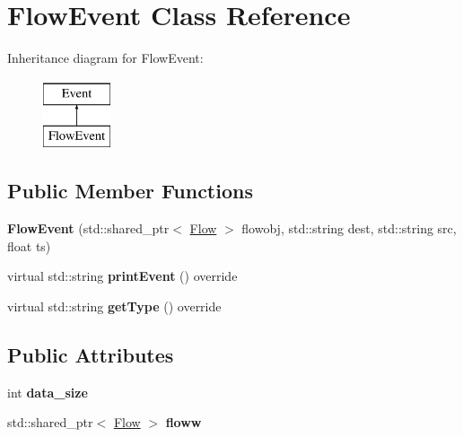 \hypertarget{classFlowEvent}{\section{\-Flow\-Event \-Class \-Reference}
\label{classFlowEvent}
}
\-Inheritance diagram for \-Flow\-Event\-:\begin{figure}[H]
\begin{center}
\leavevmode
\includegraphics[height=2.000000cm]{classFlowEvent}
\end{center}
\end{figure}
\subsection*{\-Public \-Member \-Functions}
\begin{DoxyCompactItemize}
\item 
\hypertarget{classFlowEvent_a847531a58e1e8ff6adf4a51fad9cc2c0}{{\bfseries \-Flow\-Event} (std\-::shared\-\_\-ptr$<$ \hyperlink{classFlow}{\-Flow} $>$ flowobj, std\-::string dest, std\-::string src, float ts)}\label{classFlowEvent_a847531a58e1e8ff6adf4a51fad9cc2c0}

\item 
\hypertarget{classFlowEvent_a96fc31ece4164d62db961a1ae6862e70}{virtual std\-::string {\bfseries print\-Event} () override}\label{classFlowEvent_a96fc31ece4164d62db961a1ae6862e70}

\item 
\hypertarget{classFlowEvent_a6712fde91ba4bbe86918315e85dff998}{virtual std\-::string {\bfseries get\-Type} () override}\label{classFlowEvent_a6712fde91ba4bbe86918315e85dff998}

\end{DoxyCompactItemize}
\subsection*{\-Public \-Attributes}
\begin{DoxyCompactItemize}
\item 
\hypertarget{classFlowEvent_ae6010e994bd60eff8cb63478f1df0f40}{int {\bfseries data\-\_\-size}}\label{classFlowEvent_ae6010e994bd60eff8cb63478f1df0f40}

\item 
\hypertarget{classFlowEvent_ad0ecfc4035bbfcfaa16f87fcea1b90f2}{std\-::shared\-\_\-ptr$<$ \hyperlink{classFlow}{\-Flow} $>$ {\bfseries floww}}\label{classFlowEvent_ad0ecfc4035bbfcfaa16f87fcea1b90f2}

\end{DoxyCompactItemize}


